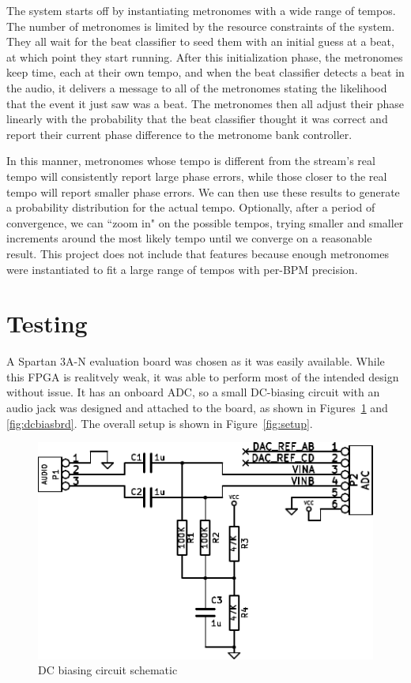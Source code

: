 \documentclass[letterpaper]{article}
\begin{document}
    The system starts off by instantiating metronomes with a wide range of
    tempos.  The number of metronomes is limited by the resource constraints of
    the system.  They all wait for the beat classifier to seed them with an
    initial guess at a beat, at which point they start running.  After this
    initialization phase, the metronomes keep time, each at their own tempo,
    and when the beat classifier detects a beat in the audio, it delivers a
    message to all of the metronomes stating the likelihood that the event it
    just saw was a beat.  The metronomes then all adjust their phase linearly
    with the probability that the beat classifier thought it was correct and
    report their current phase difference to the metronome bank controller.

    In this manner, metronomes whose tempo is different from the stream's real
    tempo will consistently report large phase errors, while those closer to
    the real tempo will report smaller phase errors.  We can then use these
    results to generate a probability distribution for the actual tempo.
    Optionally, after a period of convergence, we can ``zoom in" on the
    possible tempos, trying smaller and smaller increments around the most
    likely tempo until we converge on a reasonable result.  This project does
    not include that features because enough metronomes were instantiated to
    fit a large range of tempos with per-BPM precision.


\section{Testing}

    A Spartan 3A-N evaluation board was chosen as it was easily available.
    While this FPGA is realitvely weak, it was able to perform most of the
    intended design without issue.  It has an onboard ADC, so a small
    DC-biasing circuit with an audio jack was designed and attached to the
    board, as shown in Figures~\ref{fig:dcbias} and \ref{fig:dcbiasbrd}.  The
    overall setup is shown in Figure~\ref{fig:setup}.

    \begin{figure}
        \centering
        \includegraphics{fig/dcbias.pdf}
        \caption{DC biasing circuit schematic}
        \label{fig:dcbias}
    \end{figure}
\end{document}
